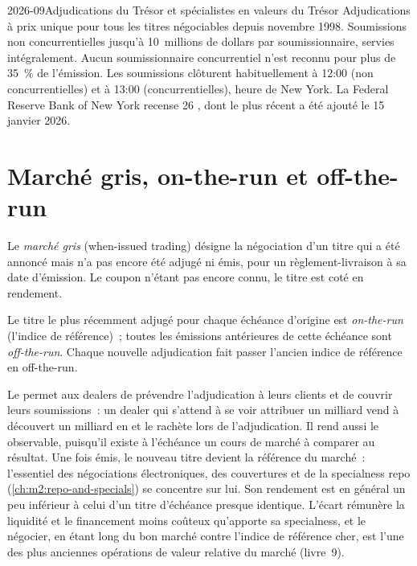 \begin{dated}{2026-09}{Adjudications du Trésor et spécialistes en valeurs du Trésor}\label{dat:m2:the-treasury-market:auctions}
Adjudications à prix unique pour tous les titres négociables depuis novembre 1998.
Soumissions non concurrentielles jusqu'à 10~millions de dollars par soumissionnaire, servies intégralement. Aucun
soumissionnaire concurrentiel n'est reconnu pour plus de 35~\% de l'émission. Les soumissions
clôturent habituellement à 12:00 (non concurrentielles) et à 13:00 (concurrentielles), heure de
New York. La Federal Reserve Bank of New York recense 26 , dont le
plus récent a été ajouté le 15 janvier 2026.
\end{dated}

\section{Marché gris, on-the-run et off-the-run}

\begin{definition}\label{def:m2:the-treasury-market:wi}
Le \emph{marché gris} (when-issued trading) désigne la négociation d'un titre
qui a été annoncé mais n'a pas encore été adjugé ni émis, pour un règlement-livraison
à sa date d'émission. Le coupon n'étant pas encore connu, le titre est coté en rendement.
\end{definition}

\begin{definition}\label{def:m2:the-treasury-market:otr}
Le titre le plus récemment adjugé pour chaque échéance d'origine est
\emph{on-the-run} (l'indice de référence)~; toutes les émissions antérieures de cette
échéance sont \emph{off-the-run}. Chaque nouvelle adjudication fait passer
l'ancien indice de référence en off-the-run.
\end{definition}

Le  permet aux dealers de prévendre l'adjudication à leurs clients et de couvrir
leurs soumissions~: un dealer qui s'attend à se voir attribuer un milliard vend à découvert un
milliard en  et le rachète lors de l'adjudication. Il rend aussi le  observable,
puisqu'il existe à l'échéance un cours de marché à comparer au
résultat. Une fois émis, le nouveau titre devient la référence du marché~: l'essentiel
des négociations électroniques, des couvertures et de la specialness repo
(\cref{ch:m2:repo-and-specials}) se concentre sur lui. Son rendement est en général un peu
inférieur à celui d'un titre  d'échéance presque identique. L'écart rémunère
la liquidité et le financement moins coûteux qu'apporte sa specialness, et
le négocier, en étant long du  bon marché contre l'indice de référence cher, est l'une des
plus anciennes opérations de valeur relative du marché (livre~9).

